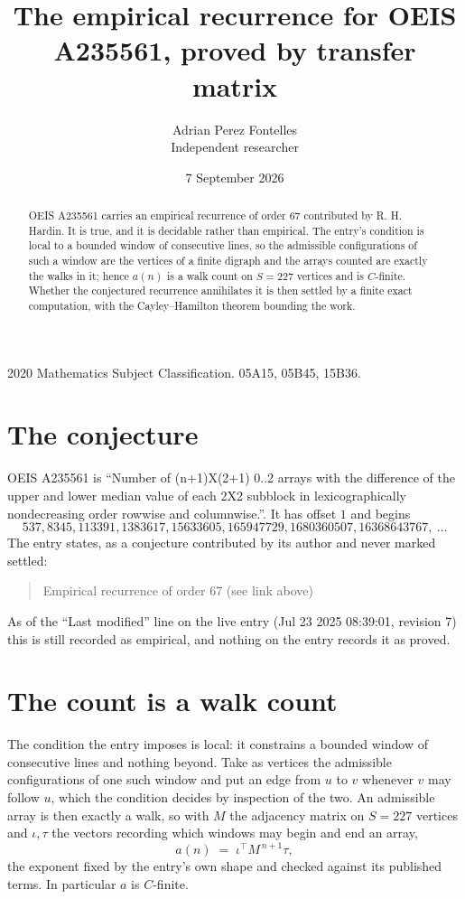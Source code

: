 \documentclass[11pt,a4paper]{article}
\title{The empirical recurrence for OEIS A235561, proved by transfer matrix}
\author{Adrian Perez Fontelles\\ \small Independent researcher}
\date{7 September 2026}
\theoremstyle{plain}
\theoremstyle{definition}
\begin{document}
\maketitle

\begin{abstract}
OEIS A235561 carries an empirical recurrence of order $67$ contributed by R. H. Hardin. It is
true, and it is decidable rather than empirical. The entry's condition is local to a bounded window of consecutive lines, so
the admissible configurations of such a window are the vertices of a finite digraph and the
arrays counted are exactly the walks in it; hence $a(n)$ is a walk count on $S=227$ vertices
and is $C$-finite. Whether the conjectured recurrence annihilates it is then settled by a
finite exact computation, with the Cayley--Hamilton theorem bounding the work.
\end{abstract}

\noindent\small 2020 Mathematics Subject Classification. 05A15, 05B45, 15B36.\normalsize

\section{The conjecture}

OEIS A235561 is ``Number of (n+1)X(2+1) 0..2 arrays with the difference of the upper and lower median value of each 2X2 subblock in lexicographically nondecreasing order rowwise and columnwise.''. It has offset $1$ and begins
\[
537, 8345, 113391, 1383617, 15633605, 165947729, 1680360507, 16368643767,\ \dots
\]
The entry states, as a conjecture contributed by its author and never marked settled:
\begin{quote}
Empirical recurrence of order 67 (see link above)
\end{quote}
As of the ``Last modified'' line on the live entry (Jul 23 2025 08:39:01, revision 7) this is still
recorded as empirical, and nothing on the entry records it as proved.

\section{The count is a walk count}

The condition the entry imposes is local: it constrains a bounded window of consecutive lines and nothing beyond. Take as
vertices the admissible configurations of one such window and put an edge from $u$ to $v$
whenever $v$ may follow $u$, which the condition decides by inspection of the two. An
admissible array is then exactly a walk, so with $M$ the adjacency matrix on $S=227$ vertices
and $\iota,\tau$ the vectors recording which windows may begin and end an array,
\[
a(n)\;=\;\iota^{\!\top}M^{\,n+1}\tau ,
\]
the exponent fixed by the entry's own shape and checked against its published terms. In
particular $a$ is $C$-finite.
\end{document}
